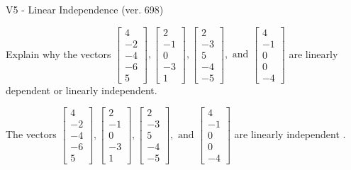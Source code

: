 \begin{exercise}
  \begin{exerciseTitle}V5 - Linear Independence (ver. 698)\end{exerciseTitle}
  \begin{exerciseStatement}
    Explain why the vectors \(\left[\begin{array}{r}
4 \\
-2 \\
-4 \\
-6 \\
5
\end{array}\right] , \left[\begin{array}{r}
2 \\
-1 \\
0 \\
-3 \\
1
\end{array}\right] , \left[\begin{array}{r}
2 \\
-3 \\
5 \\
-4 \\
-5
\end{array}\right] , \text{ and } \left[\begin{array}{r}
4 \\
-1 \\
0 \\
0 \\
-4
\end{array}\right]\) are linearly dependent or linearly independent.	


  \end{exerciseStatement}
  \begin{exerciseAnswer}
   The vectors \(\left[\begin{array}{r}
4 \\
-2 \\
-4 \\
-6 \\
5
\end{array}\right] , \left[\begin{array}{r}
2 \\
-1 \\
0 \\
-3 \\
1
\end{array}\right] , \left[\begin{array}{r}
2 \\
-3 \\
5 \\
-4 \\
-5
\end{array}\right] , \text{ and } \left[\begin{array}{r}
4 \\
-1 \\
0 \\
0 \\
-4
\end{array}\right]\) are 
  	 linearly independent  .
  


  \end{exerciseAnswer}
\end{exercise}